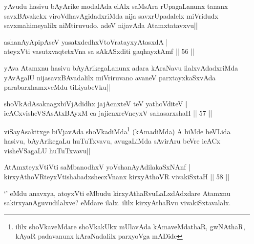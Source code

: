 \begin{artha}
yAvudu hasivu bAyArike modalAda elAlx saMsAra rUpagaLanunx tananx savxBAvakekx viroVdhavAgidadxriMda nija savxrUpadalelx miVridudx savxmahimeyalilx niMtiruvudo. adeV nijavAda Atamxtatavxvu||
\end{artha}


\begin{shl}
ashanAyApipAseV yasatxdedhxVtoVratayxyAtasxdA |\\
ateyxVti vasutxvaqtetxVna sa sAkASxditi gaqhayxtAmf \hfill || 56 ||
\end{shl}

\begin{artha}
yAva Atamxnu hasivu bAyArikegaLanunx adara kAraNavu ilalxvAdadxriMda yAvAgalU nijasavxBAvadalilx miVriruvano avaneV parxtayxkaSxvAda parabarxhamxveMdu tiLiyabeVku||
\end{artha}

\begin{shl}
shoVkAdAsaknagxbiVjAdidhx jajAcnxteV teV yathoVditeV |\\
icACxvisheVSAsAtxBAyxM ca jajicnxreV\s neyxV sahasarxshaH \hfill || 57 ||
\end{shl}

\begin{artha}
viSayAsakitxge biVjavAda shoVkadiMda\footnote[1]{ililx shoVkaveMdare shoVkakUkx mUlavAda kAmaveMdathaR, gwNAthaR, kAyaR padavanunx kAraNadalilx parxyoVga mADide} (kAmadiMda) A hiMde heVLida hasivu, bAyArikegaLu huTuTxvavu, avugaLiMda sAvirAru beVre icACx visheVSagaLU huTuTxvavu||
\end{artha}


\begin{shl}
AtAmx\s teyxVtiVti saMbanodhxV yoV\s shanAyAdilakaSxNAnf |\\
kirxyAthoVR\s teyxVtishabadxshecxVnanx kirxyAthoVR vivakiSxtaH \hfill || 58 ||
\end{shl}

\begin{artha}
`\stext ' eMdu anavxya, atoyxVti eMbudu kirxyAthaRvuLaLxdAdxdare Atamxnu sakirxyanAguvudilalxve? eMdare ilalx. ililx kirxyAthaRvu vivakiSxtavalalx. 
\end{artha}


